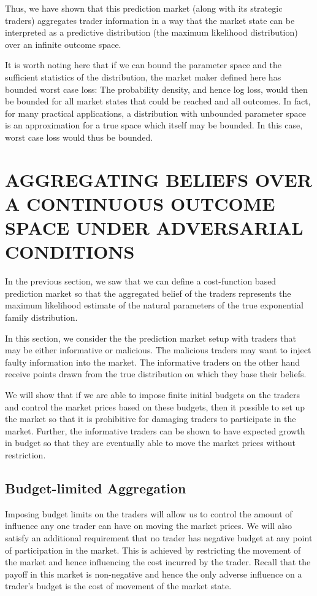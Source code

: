 \documentclass{article}
\begin{document}
Thus, we have shown that this prediction market (along with its strategic traders) aggregates trader information in a way that the market state can be interpreted as a predictive distribution (the maximum likelihood distribution) over an infinite outcome space.

It is worth noting here that if we can bound the parameter space and the sufficient statistics of the distribution, the market maker defined here has bounded worst case loss: The probability density, and hence log loss, would then be bounded for all market states that could be reached and all outcomes. In fact, for many practical applications, a distribution with unbounded parameter space is an approximation for a true space which itself may be bounded. In this case, worst case loss would thus be bounded.

\section{AGGREGATING BELIEFS OVER A CONTINUOUS OUTCOME SPACE UNDER ADVERSARIAL CONDITIONS}
In the previous section, we saw that we can define a cost-function based prediction market so that the aggregated belief of the traders represents the maximum likelihood estimate of the natural parameters of the true exponential family distribution.

In this section, we consider the the prediction market setup with traders that may be either informative or malicious. The malicious traders may want to inject faulty information into the market. The informative traders on the other hand receive points drawn from the true distribution on which they base their beliefs.

We will show that if we are able to impose finite initial budgets on the traders and control the market prices based on these budgets, then  it possible to set up the market so that it is prohibitive for damaging traders to participate in the market. Further, the informative traders can be shown to have expected growth in budget so that they are eventually able to move the market prices without restriction. 

\subsection{Budget-limited Aggregation}
Imposing budget limits on the traders will allow us to control the amount of influence any one trader can have on moving the market prices. We will also satisfy an additional requirement that no trader has negative budget at any point of participation in the market. This is achieved by restricting the movement of the market and hence influencing the cost incurred by the trader. Recall that the payoff in this market is non-negative and hence the only adverse influence on a trader's budget is the cost of movement of the market state. 
\end{document}
